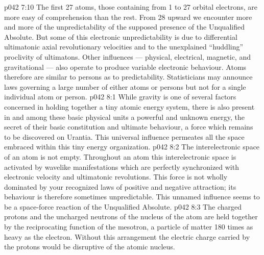 \vs p042 7:10 The first 27 atoms, those containing from 1 to 27 orbital electrons, are more easy of comprehension than the rest. From 28 upward we encounter more and more of the unpredictability of the supposed presence of the Unqualified Absolute. But some of this electronic unpredictability is due to differential ultimatonic axial revolutionary velocities and to the unexplained “huddling” proclivity of ultimatons. Other influences --- physical, electrical, magnetic, and gravitational --- also operate to produce variable electronic behaviour. Atoms therefore are similar to persons as to predictability. Statisticians may announce laws governing a large number of either atoms or persons but not for a single individual atom or person.
\vs p042 8:1 While gravity is one of several factors concerned in holding together a tiny atomic energy system, there is also present in and among these basic physical units a powerful and unknown energy, the secret of their basic constitution and ultimate behaviour, a force which remains to be discovered on Urantia. This universal influence permeates all the space embraced within this tiny energy organization.
\vs p042 8:2 The interelectronic space of an atom is not empty. Throughout an atom this interelectronic space is activated by wavelike manifestations which are perfectly synchronized with electronic velocity and ultimatonic revolutions. This force is not wholly dominated by your recognized laws of positive and negative attraction; its behaviour is therefore sometimes unpredictable. This unnamed influence seems to be a space\hyp{}force reaction of the Unqualified Absolute.
\vs p042 8:3 \pc The charged protons and the uncharged neutrons of the nucleus of the atom are held together by the reciprocating function of the mesotron, a particle of matter 180 times as heavy as the electron. Without this arrangement the electric charge carried by the protons would be disruptive of the atomic nucleus.
